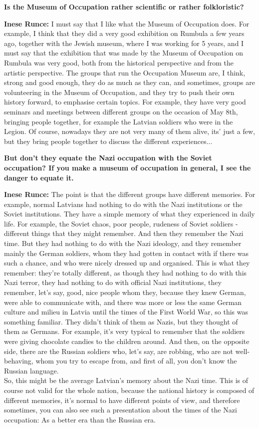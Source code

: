 \textbf{Is the Museum of Occupation rather scientific or rather folkloristic?}

\textbf{Inese Runce:} I must say that I like what the Museum of Occupation does. For example, I think that they did a very good exhibition on Rumbula a few years ago, together with the Jewish museum, where I was working for 5 years, and I must say that the exhibition that was made by the Museum of Occupation on Rumbula was very good, both from the historical perspective and from the artistic perspective. The groups that run the Occupation Museum are, I think, strong and good enough, they do as much as they can, and sometimes, groups are volunteering in the Museum of Occupation, and they try to push their own  history forward, to emphasise certain topics. For example, they have very good seminars and meetings between different groups on the occasion of May 8th, bringing people together, for example the Latvian soldiers who were in the Legion. Of course, nowadays they are not very many of them alive, its' just a few, but they bring people together to discuss the different experiences...

\textbf{But don't they equate the Nazi occupation with the Soviet occupation? If you make a museum of occupation in general, I see the danger to equate it.} 
 
\textbf{Inese Runce:} The point is that the different groups have different memories. For example, normal Latvians had nothing to do with the Nazi institutions or the Soviet institutions. They have a simple memory of what they experienced in daily life.  For example, the Soviet chaos, poor people, rudeness of Soviet soldiers - different things that they might remember. And then they remember the Nazi time. But they had nothing to do with the Nazi ideology, and they remember mainly the German soldiers, whom they had gotten in contact with if there was such a chance, and who were nicely  dressed up and organised. This is what they remember: they're totally different, as though they had nothing to do with this Nazi terror, they had nothing to do with official Nazi institutions, they remember, let's say, good, nice people whom they, because they knew German, were able to communicate with, and there was more or less the same German culture and milieu in Latvia until the times of the First World War, so this was something familiar. They didn't think of them as Nazis, but they thought of them as Germans. For example,  it's very typical to remember that the soldiers were giving chocolate  candies to the children around. And then, on the opposite side, there are the Russian soldiers who, let's say, are robbing, who are not well-behaving, whom you try to escape from, and first of all, you don't know the Russian language. \\
So, this might be the average Latvian's memory about the Nazi time. This is of course not valid for the whole nation, because the national history is composed of different memories, it’s normal to have different points of view, and therefore sometimes, you can also see such a presentation about the times of the Nazi occupation: As a better era than the Russian era.
